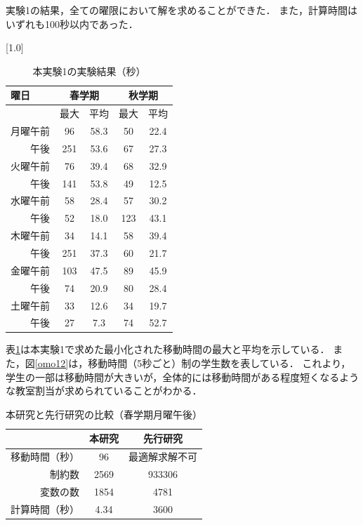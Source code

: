\documentclass[a4paper,10pt]{jarticle}
\begin{document}
実験1の結果，全ての曜限において解を求めることができた．
また，計算時間はいずれも100秒以内であった．
\vspace{-7.0mm}
\begin{table}[h]
\vspace{-2.0mm}
\begin{center}
\caption{本実験1の実験結果（秒）}
\label{jikken1}
\scalebox{1.0}[1.0]{ 
\begin{tabular}{l|cc|cc}
\hline
曜日 & \multicolumn{2}{c|}{春学期} & \multicolumn{2}{|c}{秋学期}\\
\hline
 & 最大 & 平均 &  最大 & 平均\\
\hline
月曜午前  & 96  & 58.3 & 50  & 22.4\\
　　午後  & 251 & 53.6 & 67  & 27.3\\
火曜午前  & 76  & 39.4 & 68  & 32.9\\
　　午後  & 141 & 53.8 & 49  & 12.5\\
水曜午前  & 58  & 28.4 & 57  & 30.2\\
　　午後  & 52  & 18.0 & 123 & 43.1\\
木曜午前  & 34  & 14.1 & 58  & 39.4\\
　　午後  & 251 & 37.3 & 60  & 21.7\\
金曜午前  & 103 & 47.5 & 89  & 45.9\\
　　午後  & 74  & 20.9 & 80  & 28.4\\
土曜午前  & 33  & 12.6 & 34  & 19.7\\
　　午後  & 27  & 7.3 & 74  & 52.7\\
\hline
\end{tabular}
}
\end{center}
\end{table}
\vspace{-5.0mm}

表\ref{jikken1}は本実験1で求めた最小化された移動時間の最大と平均を示している．
また，図\ref{omo12}は，移動時間（5秒ごと）制の学生数を表している．
これより，学生の一部は移動時間が大きいが，全体的には移動時間がある程度短くなるような教室割当が求められていることがわかる．


\begin{table}[h]
\vspace{-2.0mm}
\begin{center}
\caption{本研究と先行研究の比較（春学期月曜午後）}
\label{hikaku2}
\begin{tabular}{r|cc}
\hline
&本研究&先行研究 \\
\hline
移動時間（秒）& 96  & 最適解求解不可  \\  
制約数& 2569 &  933306 \\ 
変数の数&1854 & 4781 \\
計算時間（秒） &4.34&  3600\\
\hline
\end{tabular}
\vspace{-7.0mm}
\end{center}
\end{table}
\end{document}
